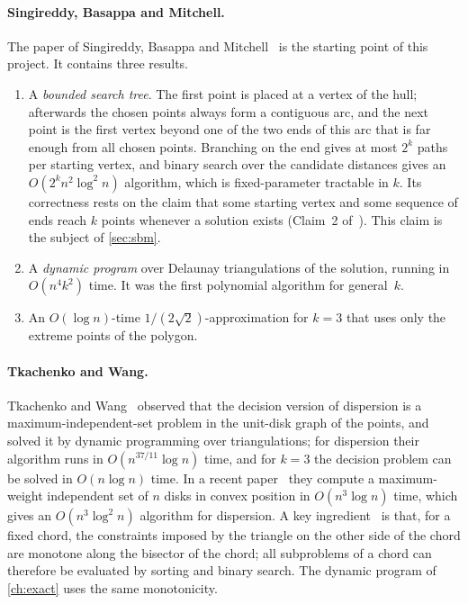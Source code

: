 \paragraph{Singireddy, Basappa and Mitchell.}
The paper of Singireddy, Basappa and Mitchell~\citep{sbm} is the starting point
of this project. It contains three results.
\begin{enumerate}[leftmargin=*,itemsep=2pt]
\item A \emph{bounded search tree}. The first point is placed at a vertex of the
hull; afterwards the chosen points always form a contiguous arc, and the next
point is the first vertex beyond one of the two ends of this arc that is far
enough from all chosen points. Branching on the end gives at most $2^{k}$
paths per starting vertex, and binary search over the candidate distances
gives an $O(2^kn^2\log^2n)$ algorithm, which is fixed-parameter tractable in
$k$. Its correctness rests on the claim that some starting vertex and some
sequence of ends reach $k$ points whenever a solution exists (Claim~2
of~\citep{sbm}). This claim is the subject of \cref{sec:sbm}.
\item A \emph{dynamic program} over Delaunay triangulations of the solution,
running in $O(n^4k^2)$ time. It was the first polynomial algorithm for
general~$k$.
\item An $O(\log n)$-time $1/(2\sqrt2)$-approximation for $k=3$ that uses only the
extreme points of the polygon.
\end{enumerate}

\paragraph{Tkachenko and Wang.}
Tkachenko and Wang~\citep{tw25} observed that the decision version of
dispersion is a maximum-independent-set problem in the unit-disk graph of the
points, and solved it by dynamic programming over triangulations; for
dispersion their algorithm runs in $O(n^{37/11}\log n)$ time, and for $k=3$
the decision problem can be solved in $O(n\log n)$ time. In a recent
paper~\citep{tw26} they compute a maximum-weight independent set of $n$ disks
in convex position in $O(n^3\log n)$ time, which gives an $O(n^3\log^2 n)$
algorithm for dispersion. A key ingredient~\citep[Lemma~12]{tw26} is that, for
a fixed chord, the constraints imposed by the triangle on the other side of
the chord are monotone along the bisector of the chord; all subproblems of a
chord can therefore be evaluated by sorting and binary search. The dynamic
program of \cref{ch:exact} uses the same monotonicity.

